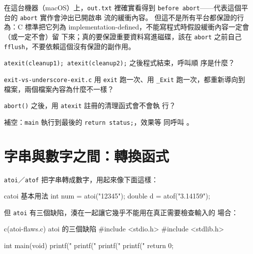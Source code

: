 
在這台機器（macOS）上，\texttt{out.txt} 裡確實看得到
\texttt{before abort}——代表這個平台的 \texttt{abort} 實作會沖出已開啟串
流的緩衝內容。 但這不是所有平台都保證的行為：C 標準把它列為
implementation-defined，不能寫程式時假設緩衝內容一定會（或一定不會）留
下來；真的要保證重要資料寫進磁碟，該在 \texttt{abort} 之前自己
\texttt{fflush}，不要依賴這個沒有保證的副作用。


\begin{drills}[label=drills:sl-startend]
\item \texttt{atexit(cleanup1); atexit(cleanup2);} 之後程式結束，呼叫順
序是什麼？
\item \texttt{exit-vs-underscore-exit.c} 用 \texttt{exit} 跑一次、用
\texttt{\_Exit} 跑一次，都重新導向到檔案，兩個檔案內容為什麼不一樣？
\item \texttt{abort()} 之後，用 \texttt{atexit} 註冊的清理函式會不會執
行？
\item 補空：\texttt{main} 執行到最後的 \texttt{return status;}，效果等
同呼叫 \underline{\hspace{2em}}。
\end{drills}

\section{字串與數字之間：轉換函式}
\label{sec:sl-strtol}

\texttt{atoi}／\texttt{atof} 把字串轉成數字，用起來像下面這樣：

\begin{code}{c}{atoi 基本用法}
int num = atoi("12345");
double d = atof("3.14159");
\end{code}

但 \texttt{atoi} 有三個缺陷，湊在一起讓它幾乎不能用在真正需要檢查輸入的
場合：

\begin{example}{c}{(atoi-flaws.c) atoi 的三個缺陷}
#include <stdio.h>
#include <stdlib.h>

int main(void) {
    printf("%
    printf("%
    printf("%
    printf("%
    return 0;
}
\end{example}


